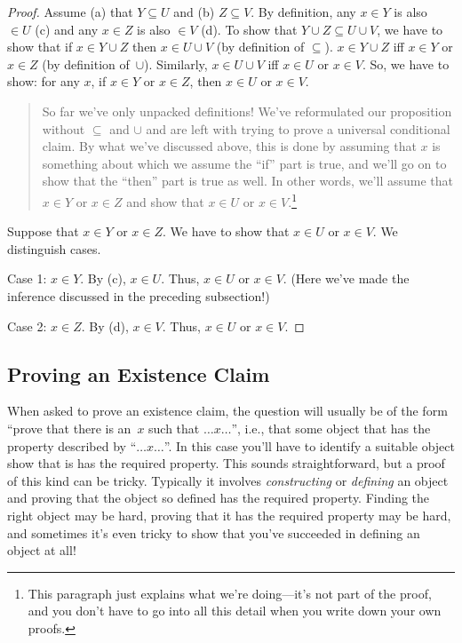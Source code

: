 \documentclass[../../../include/open-logic-section]{subfiles}
\begin{document}
\begin{proof}
  Assume (a) that $Y \subseteq U$ and (b) $Z \subseteq V$. By
  definition, any $x \in Y$ is also $\in U$ (c) and any $x \in Z$ is
  also $\in V$ (d).  To show that $Y \cup Z \subseteq U \cup V$, we
  have to show that if $x \in Y \cup Z$ then $x \in U \cup V$ (by
  definition of $\subseteq$). $x \in Y \cup Z$ iff $x \in Y$ or $x \in
  Z$ (by definition of~$\cup$). Similarly, $x \in U \cup V$ iff $x \in
  U$ or $x \in V$. So, we have to show: for any $x$, if $x \in Y$ or
  $x \in Z$, then $x \in U$ or $x \in V$.

  \begin{quote}
  So far we've only unpacked definitions!{} We've reformulated our
  proposition without $\subseteq$ and $\cup$ and are left with trying
  to prove a universal conditional claim. By what we've discussed
  above, this is done by assuming that $x$ is something about which we
  assume the ``if'' part is true, and we'll go on to show that the
  ``then'' part is true as well. In other words, we'll assume that $x
  \in Y$ or $x \in Z$ and show that $x \in U$ or $x \in
  V$.\footnote{This paragraph just explains what we're doing---it's
    not part of the proof, and you don't have to go into all this
    detail when you write down your own proofs.}
  \end{quote}

  Suppose that $x \in Y$ or $x \in Z$. We have to show that $x \in U$
  or $x \in V$. We distinguish cases.

  Case 1: $x \in Y$. By (c), $x \in U$. Thus, $x \in U$ or $x \in
  V$. (Here we've made the inference discussed in the preceding
  subsection!)
      
  Case 2: $x \in Z$. By (d), $x \in V$. Thus, $x \in U$ or $x \in V$.
 \end{proof}


\subsection{Proving an Existence Claim}

When asked to prove an existence claim, the question will usually be
of the form ``prove that there is an~$x$ such that $\dots x \dots$'',
i.e., that some object that has the property described by ``$\dots x
\dots$''. In this case you'll have to identify a suitable object show
that is has the required property.  This sounds straightforward, but a
proof of this kind can be tricky. Typically it involves
\emph{constructing} or \emph{defining} an object and proving that the
object so defined has the required property. Finding the right object
may be hard, proving that it has the required property may be hard,
and sometimes it's even tricky to show that you've succeeded in
defining an object at all!{}
\end{document}
